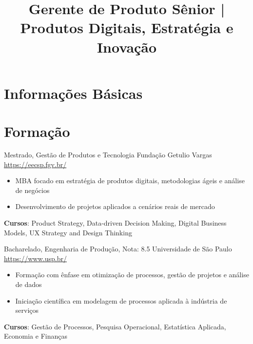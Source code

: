 \documentclass[a4paper, serif, 10pt]{moderncv}
\title{Gerente de Produto Sênior | Produtos Digitais, Estratégia e Inovação}
\begin{document}
\maketitle

\section{Informações Básicas}

\section{Formação}

        {Mestrado, Gestão de Produtos e Tecnologia}
        {Fundação Getulio Vargas}
        {\url{https://eecsp.fgv.br/}}
        {}
        {\begin{itemize}
\item MBA focado em estratégia de produtos digitais, metodologias ágeis e análise de negócios
\item Desenvolvimento de projetos aplicados a cenários reais de mercado
\end{itemize}
\textbf{Cursos}: Product Strategy, Data-driven Decision Making, Digital Business Models, UX Strategy and Design Thinking}

        {Bacharelado, Engenharia de Produção, Nota: 8.5}
        {Universidade de São Paulo}
        {\url{https://www.usp.br/}}
        {}
        {\begin{itemize}
\item Formação com ênfase em otimização de processos, gestão de projetos e análise de dados
\item Iniciação científica em modelagem de processos aplicada à indústria de serviços
\end{itemize}
\textbf{Cursos}: Gestão de Processos, Pesquisa Operacional, Estatística Aplicada, Economia e Finanças}
\end{document}
